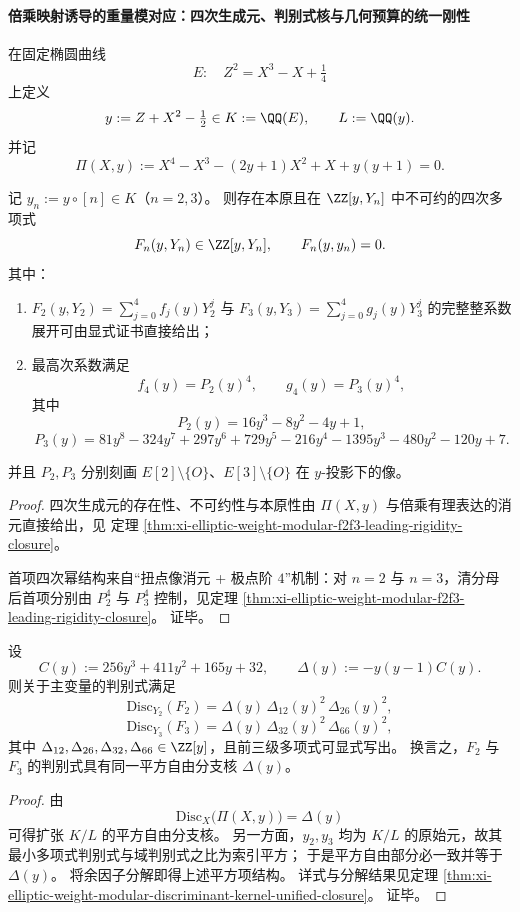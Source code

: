 \paragraph{倍乘映射诱导的重量模对应：四次生成元、判别式核与几何预算的统一刚性}
在固定椭圆曲线
\[
E:\quad Z^2=X^3-X+\tfrac14
\]
上定义
\[
y:=Z+X^2-\tfrac12\in K:=\QQ(E),\qquad L:=\QQ(y).
\]
并记
\[
\Pi(X,y):=X^4-X^3-(2y+1)X^2+X+y(y+1)=0.
\]

\begin{theorem}[二倍乘与三倍乘的四次模方程及首项扭点刚性]\label{thm:xi-elliptic-weight-modular-f2f3-leading-rigidity-closure}
记 \(y_n:=y\circ[n]\in K\)（\(n=2,3\)）。
则存在本原且在 \(\ZZ[y,Y_n]\) 中不可约的四次多项式
\[
F_n(y,Y_n)\in \ZZ[y,Y_n],\qquad F_n(y,y_n)=0.
\]
其中：
\begin{enumerate}
  \item \(F_2(y,Y_2)=\sum_{j=0}^4 f_j(y)Y_2^j\) 与 \(F_3(y,Y_3)=\sum_{j=0}^4 g_j(y)Y_3^j\) 的完整整系数展开可由显式证书直接给出；
  \item 最高次系数满足
  \[
  f_4(y)=P_2(y)^4,\qquad g_4(y)=P_3(y)^4,
  \]
  其中
  \[
  P_2(y)=16y^3-8y^2-4y+1,
  \]
  \[
  P_3(y)=81y^8-324y^7+297y^6+729y^5-216y^4-1395y^3-480y^2-120y+7.
  \]
\end{enumerate}
并且 \(P_2,P_3\) 分别刻画 \(E[2]\setminus\{O\}\)、\(E[3]\setminus\{O\}\) 在 \(y\)-投影下的像。
\end{theorem}
\begin{proof}
四次生成元的存在性、不可约性与本原性由
\(\Pi(X,y)\) 与倍乘有理表达的消元直接给出，见
定理 \ref{thm:xi-elliptic-weight-modular-f2f3-leading-rigidity-closure}。
\par
首项四次幂结构来自“扭点像消元 + 极点阶 \(4\)”机制：对 \(n=2\) 与 \(n=3\)，清分母后首项分别由
\(
P_2^4
\) 与
\(
P_3^4
\)
控制，见定理
\ref{thm:xi-elliptic-weight-modular-f2f3-leading-rigidity-closure}。
证毕。
\end{proof}

\begin{theorem}[判别式平方自由核的统一性与索引平方分解]\label{thm:xi-elliptic-weight-modular-discriminant-kernel-unified-closure}
设
\[
C(y):=256y^3+411y^2+165y+32,\qquad \Delta(y):=-y(y-1)C(y).
\]
则关于主变量的判别式满足
\[
\mathrm{Disc}_{Y_2}(F_2)=\Delta(y)\,\Delta_{12}(y)^2\,\Delta_{26}(y)^2,
\]
\[
\mathrm{Disc}_{Y_3}(F_3)=\Delta(y)\,\Delta_{32}(y)^2\,\Delta_{66}(y)^2,
\]
其中 \(\Delta_{12},\Delta_{26},\Delta_{32},\Delta_{66}\in\ZZ[y]\)，且前三级多项式可显式写出。
换言之，\(F_2\) 与 \(F_3\) 的判别式具有同一平方自由分支核 \(\Delta(y)\)。
\end{theorem}
\begin{proof}
由
\[
\mathrm{Disc}_X\!\bigl(\Pi(X,y)\bigr)=\Delta(y)
\]
可得扩张 \(K/L\) 的平方自由分支核。
另一方面，\(y_2,y_3\) 均为 \(K/L\) 的原始元，故其最小多项式判别式与域判别式之比为索引平方；
于是平方自由部分必一致并等于 \(\Delta(y)\)。
将余因子分解即得上述平方项结构。
详式与分解结果见定理
\ref{thm:xi-elliptic-weight-modular-discriminant-kernel-unified-closure}。
证毕。
\end{proof}

